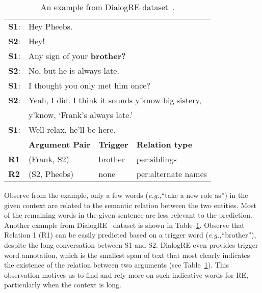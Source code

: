 \documentclass[letterpaper]{article} \usepackage{aaai21}  \usepackage{times}  \usepackage{helvet} \usepackage{courier}  \usepackage[hyphens]{url}  \usepackage{graphicx} \urlstyle{rm} \def\UrlFont{\rm}  \usepackage{graphicx}  \usepackage{natbib}  \usepackage{caption}
\newcommand{\eg}{\emph{e.g.,}\xspace}
\begin{document}
\begin{table}
\caption{An example from DialogRE dataset~\cite{yu-etal-2020-dialogue}.}
\vspace{-2mm}
\label{tbl-dialog-example}
\centering
\begin{tabular}{llll}
\toprule
\textbf{S1}: & \multicolumn{3}{l}{Hey Pheebs.}                                                                         \\
\textbf{S2}: & \multicolumn{3}{l}{Hey!}                                                                                \\
\textbf{S1}: & \multicolumn{3}{l}{Any sign of your \textbf{brother?}}                                                           \\
\textbf{S2}: & \multicolumn{3}{l}{No, but he is always late.}                                                          \\
\textbf{S1}: & \multicolumn{3}{l}{I thought you only met him once?}                                                    \\
\textbf{S2}: & \multicolumn{3}{l}{Yeah, I did. I think it sounds y’know big sistery,} \\
 & \multicolumn{3}{l}{ y’know,   ‘Frank’s always late.’} \\
\textbf{S1}: & \multicolumn{3}{l}{Well relax, he’ll be here.}                                                          \\
\midrule
    & \textbf{Argument Pair}                     & \textbf{Trigger}                    & \textbf{Relation type}                          \\
\textbf{R1}  & (Frank, S2)                       & brother                    & per:siblings                           \\
\textbf{R2}  & (S2, Pheebs)                      & none                       & per:alternate names                 \\
\bottomrule
\end{tabular}
\end{table}

Observe from the example, only a few words (\eg ``take a new role as'') in the given context are related to the semantic relation between the two entities.  Most of the remaining words in the given sentence are less relevant to the prediction. Another example from  DialogRE~\cite{yu-etal-2020-dialogue} dataset is shown in Table~\ref{tbl-dialog-example}.  Observe that Relation 1 (R1) can be easily predicted based on a trigger word (\eg ``brother''), despite the long conversation between S1 and S2. DialogRE even provides trigger word annotation, which is the smallest span of text that most clearly indicates the existence of the relation between two arguments (see Table~\ref{tbl-dialog-example}). This observation motives us to find and rely more on such indicative words for RE, particularly when the context is long.
\end{document}
